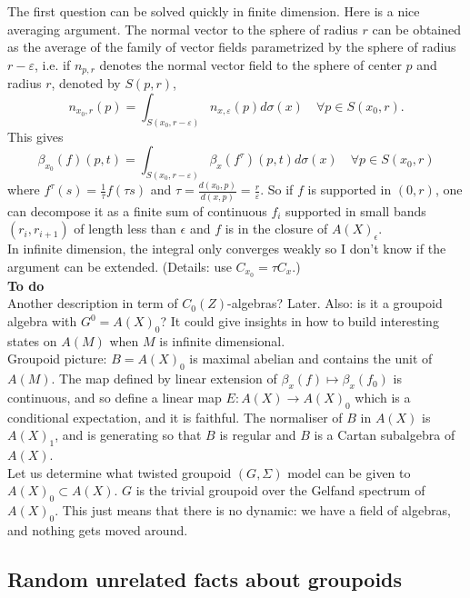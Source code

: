 The first question can be solved quickly in finite dimension. Here is a nice averaging argument. The normal vector to the sphere of radius $r$ can be obtained as the average of the family of vector fields parametrized by the sphere of radius $r-\varepsilon$, i.e. if $ n_{p,r}$ denotes the normal vector field to the sphere of center $p$ and radius $r$, denoted by $S(p,r)$,
\[n_{x_0,r}(p) = \int_{ S(x_0, r-\varepsilon)} n_{x,\varepsilon} (p) d\sigma(x) \quad \forall p\in S(x_0 , r).\]
This gives
\[\beta_{x_0}(f) (p,t) =  \int_{ S(x_0, r-\varepsilon)} \beta_{x}(f^\tau) (p,t) d\sigma(x) \quad \forall p\in S(x_0 , r)\]
where $f^\tau (s) = \frac{1}{\tau} f(\tau s)$ and $\tau= \frac{d(x_0 ,p)}{d(x,p)} = \frac{r}{\varepsilon}$. So if $f$ is supported in $(0,r)$, one can decompose it as a finite sum of continuous $f_i$ supported in small bands $(r_i , r_{i+1})$ of length less than $\epsilon$ and $f$ is in the closure of $A(X)_\epsilon$.\\

In infinite dimension, the integral only converges weakly so I don't know if the argument can be extended. (Details: use $C_{x_0}= \tau C_x$.)\\

\textbf{To do} \\

Another description in term of $C_0(Z)$-algebras? Later. Also: is it a groupoid algebra with $G^0 = A(X)_0$? It could give insights in how to build interesting states on $A(M)$ when $M$ is infinite dimensional.\\

Groupoid picture: $B=A(X)_0$ is maximal abelian and contains the unit of $A(M)$. The map defined by linear extension of $\beta_x(f)\mapsto \beta_x(f_0)$ is continuous, and so define a linear map $E: A(X)\rightarrow A(X)_0$ which is a conditional expectation, and it is faithful. The normaliser of $B$ in $A(X)$ is $A(X)_1$, and is generating so that $B$ is regular and $B$ is a Cartan subalgebra of $A(X)$.\\

Let us determine what twisted groupoid $(G,\Sigma)$ model can be given to $A(X)_0 \subset A(X)$. $G$ is the trivial groupoid over the Gelfand spectrum of $A(X)_0$. This just means that there is no dynamic: we have a field of algebras, and nothing gets moved around.

\subsection*{Random unrelated facts about groupoids}

